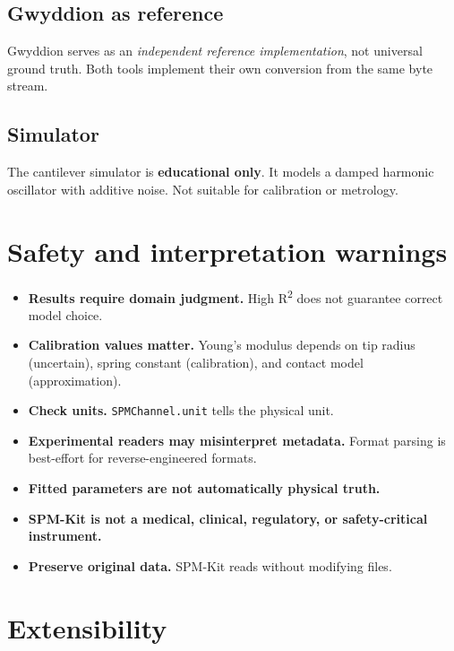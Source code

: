\documentclass[a4paper,11pt]{article}
\begin{document}
\subsection{Gwyddion as reference}
Gwyddion serves as an \emph{independent reference implementation}, not universal ground
truth. Both tools implement their own conversion from the same byte stream.

\subsection{Simulator}
The cantilever simulator is \textbf{educational only}. It models a damped harmonic
oscillator with additive noise. Not suitable for calibration or metrology.

\section{Safety and interpretation warnings}

\begin{itemize}
  \item \textbf{Results require domain judgment.} High R\textsuperscript{2} does not guarantee correct model choice.
  \item \textbf{Calibration values matter.} Young's modulus depends on tip radius (uncertain),
    spring constant (calibration), and contact model (approximation).
  \item \textbf{Check units.} \texttt{SPMChannel.unit} tells the physical unit.
  \item \textbf{Experimental readers may misinterpret metadata.} Format parsing is
    best-effort for reverse-engineered formats.
  \item \textbf{Fitted parameters are not automatically physical truth.}
  \item \textbf{SPM-Kit is not a medical, clinical, regulatory, or safety-critical instrument.}
  \item \textbf{Preserve original data.} SPM-Kit reads without modifying files.
\end{itemize}

\section{Extensibility}
\end{document}

